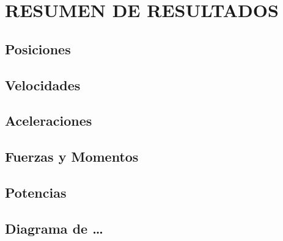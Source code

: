 \section{RESUMEN DE RESULTADOS}

\subsection{Posiciones}

\subsection{Velocidades}

\subsection{Aceleraciones}

\subsection{Fuerzas y Momentos}

\subsection{Potencias}

\subsection{Diagrama de \ldots}
